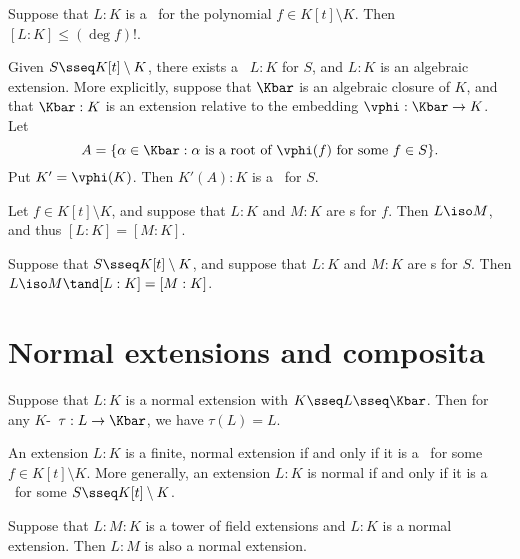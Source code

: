 \documentclass{article}
\begin{document}
  \begin{tproposition}
    Suppose that $L:K$ is a \sfe~for the polynomial $f\in K[t]\setminus K$. Then $[L:K]\leq (\deg f)!$.
  \end{tproposition}

  \begin{tproposition}
    Given $S\sseq K[t]\setminus K$, there exists a \sfe~$L:K$ for $S$, and $L:K$ is an algebraic extension. More explicitly, suppose that $\Kbar$ is an algebraic closure of $K$, and that $\Kbar:K$ is an extension relative to the embedding $\vphi:\Kbar\to K$. Let
    \[
      A=\{ \alpha\in \Kbar : \alpha\text{ is a root of } \vphi(f) \text{ for some } f\in S \}.
    \]
    Put $K'=\vphi(K)$. Then $K'(A):K$ is a \sfe~for $S$.
  \end{tproposition}

  \begin{ttheorem}
    Let $f\in K[t]\setminus K$, and suppose that $L:K$ and $M:K$ are \sfe s for $f$. Then $L\iso M$, and thus $[L:K]=[M:K]$.
  \end{ttheorem}

  \begin{ttheorem}
    Suppose that $S\sseq K[t]\setminus K$, and suppose that $L:K$ and $M:K$ are \sfe s for $S$. Then $L\iso M\tand [L:K]=[M:K]$.
  \end{ttheorem}

\section{Normal extensions and composita}
  \begin{tproposition}
    Suppose that $L:K$ is a normal extension with $K\sseq L\sseq \Kbar$. Then for any $K$-\homo~$\tau:L\to \Kbar$, we have $\tau(L)=L$.
  \end{tproposition}

  \begin{tproposition}
    An extension $L:K$ is a finite, normal extension if and only if it is a \sfe~for some $f\in K[t]\setminus K$. More generally, an extension $L:K$ is normal if and only if it is a \sfe~for some $S\sseq K[t]\setminus K$.
  \end{tproposition}

  \begin{tproposition}
    Suppose that $L:M:K$ is a tower of field extensions and $L:K$ is a normal extension. Then $L:M$ is also a normal extension.
  \end{tproposition}
\end{document}
